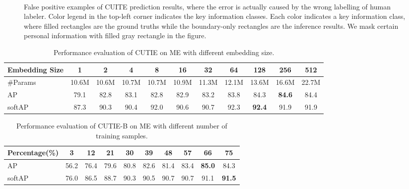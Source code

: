 \documentclass[10pt,twocolumn,letterpaper]{article}
\begin{document}
\begin{figure}
\begin{center}
\\
\end{center}
   \caption{False positive examples of CUITE prediction results, where the error is actually caused by the wrong labelling of human labeler. Color legend in the top-left corner indicates the key information classes. Each color indicates a key information class, where filled rectangles are the ground truths while the boundary-only rectangles are the inference results.  We mask certain personal information with filled gray rectangle in the figure.}
\label{fig:falselabel}
\end{figure}

\begin{table}
	\caption{Performance evaluation of CUTIE on ME with different embedding size.}
\begin{center}
\begin{tabular}{l | c | c | c | c | c | c | c | c | c | c}
	Embedding Size & 1 & 2 & 4 & 8 & 16 & 32 & 64 & 128 & 256 & 512 \\
	\hline
	\#Params & 10.6M & 10.6M & 10.7M & 10.7M & 10.9M & 11.3M & 12.1M & 13.6M & 16.6M & 22.7M \\
	AP & 79.1 & 82.8 & 83.1 & 82.8 & 82.9 & 83.2 & 83.8 & 84.3 & \textbf{84.6} & 84.4 \\
	softAP & 87.3 & 90.3 & 90.4 & 92.0 & 90.6 & 90.7 & 92.3 & \textbf{92.4} & 91.9 & 91.9 \\
\end{tabular}
\end{center}
	\label{tab:embedding}
\end{table}

\begin{table}
	\caption{Performance evaluation of CUTIE-B on ME with different number of training samples.}
\begin{center}
\begin{tabular}{l | c | c | c | c | c | c | c | c | c}
	Percentage(\%) & 3 & 12 & 21 & 30 & 39 & 48 & 57 & 66 & 75 \\
	\hline
	AP & 56.2 & 76.4 & 79.6 & 80.8 & 82.6 & 81.4 & 83.4 & \textbf{85.0} & 84.3 \\
	softAP & 76.0 & 86.5 & 88.7 & 90.3 & 90.5 & 90.7 & 90.7 & 91.1 & \textbf{91.5} \\
\end{tabular}
\end{center}
	\label{tab:samples}
\end{table}
\end{document}
